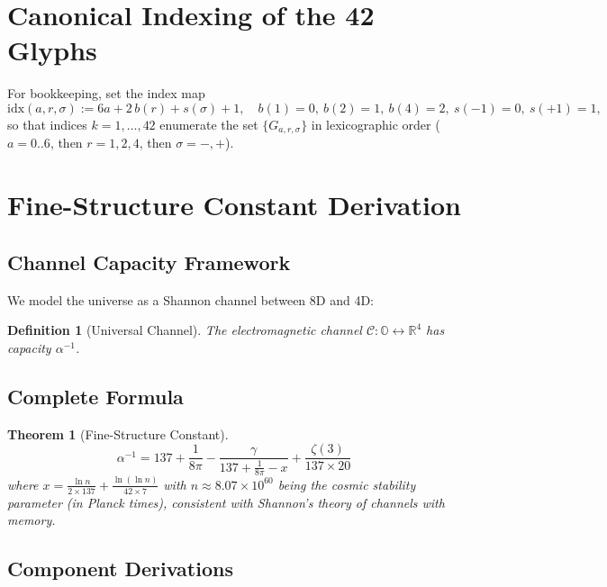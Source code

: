 \documentclass[pdflatex,sn-mathphys-num]{sn-jnl}
\theoremstyle{thmstyleone}
\newtheorem{theorem}{Theorem}
\theoremstyle{thmstyletwo}
\theoremstyle{thmstylethree}
\newtheorem{definition}{Definition}
\begin{document}
\section{Canonical Indexing of the 42 Glyphs}
For bookkeeping, set the index map
\[
\mathrm{idx}(a,r,\sigma)
:= 6a + 2\,b(r) + s(\sigma) + 1,
\quad
b(1)=0,\ b(2)=1,\ b(4)=2,\ 
s(-1)=0,\ s(+1)=1,
\]
so that indices \(k=1,\dots,42\) enumerate the set
\(\{G_{a,r,\sigma}\}\) in lexicographic order
(\(a=0..6\), then \(r=1,2,4\), then \(\sigma=-,+\)).
\section{Fine-Structure Constant Derivation}\label{sec:s1-derivation}

\subsection{Channel Capacity Framework}\label{subsec:s1-channel}
We model the universe as a Shannon channel between 8D and 4D:

\begin{definition}[Universal Channel]\label{def:s1-universal}
The electromagnetic channel $\mathcal{C}: \mathbb{O} \leftrightarrow \mathbb{R}^4$ has capacity $\alpha^{-1}$.
\end{definition}

\subsection{Complete Formula}\label{subsec:s1-complete}

\begin{theorem}[Fine-Structure Constant]\label{thm:s1-alpha}
\begin{equation}\label{eq:alpha-main}
\alpha^{-1} = 137 + \frac{1}{8\pi} - \frac{\gamma}{137 + \frac{1}{8\pi} - x} + \frac{\zeta(3)}{137 \times 20}
\end{equation}
where $x = \frac{\ln n}{2 \times 137} + \frac{\ln(\ln n)}{42 \times 7}$ with $n \approx 8.07 \times 10^{60}$ being the cosmic stability parameter (in Planck times), consistent with Shannon’s theory of channels with memory.
\end{theorem}


\subsection{Component Derivations}\label{subsec:s1-components}
\end{document}
